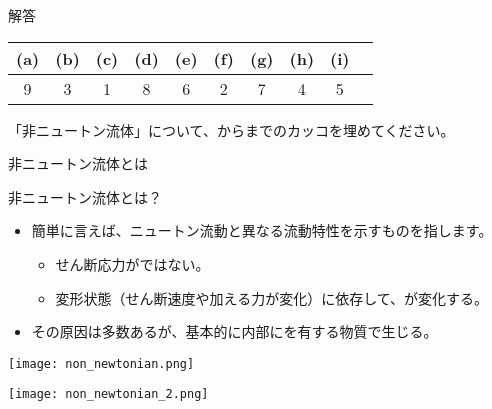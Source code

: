 \documentclass[uplatex,dvipdfmx,a4paper,11pt]{jsarticle}
\begin{document}
\begin{itembox}[l]{解答}
    \begin{center} 
      \begin{tabular}{|c|c|c|c|c|c|c|c|c|c|} \hline
        (a) & (b) & (c) & (d) & (e) & (f) & (g) & (h) & (i)\\ \hline
        9 & 3 & 1 & 8 & 6 & 2 & 7 & 4 & 5 \\ \hline		
      \end{tabular}
    \end{center}
\end{itembox}

\begin{qlist}
	\qitem 「非ニュートン流体」について、からまでのカッコを埋めてください。

			\vspace{3mm}
			\begin{qlist2}
			\qitem 非ニュートン流体とは
			\begin{center}
				\begin{minipage}{0.9\textwidth}
					\begin{itembox}[l]{非ニュートン流体とは？}
						\begin{itemize}
							\item 簡単に言えば、ニュートン流動と異なる流動特性を示すものを指します。
							\begin{itemize}
								\item せん断応力が\qbox{}ではない。
								\item 変形状態（せん断速度や加える力が変化）に依存して、\qbox{}が変化する。
							\end{itemize}
							\item その原因は多数あるが、基本的に内部に\qbox{}を有する物質で生じる。
						\end{itemize}
					\end{itembox}
				\end{minipage}

				\vspace{4mm}

				\begin{minipage}{0.43\textwidth}
					\begin{center}
					\texttt{[image: non\_newtonian.png]}
					\end{center}
				\end{minipage}
				\begin{minipage}{0.43\textwidth}
					\begin{center}
					\texttt{[image: non\_newtonian\_2.png]}
					\end{center}
				\end{minipage}
			\end{center}


\end{qlist2}
\end{qlist}
\end{document}
